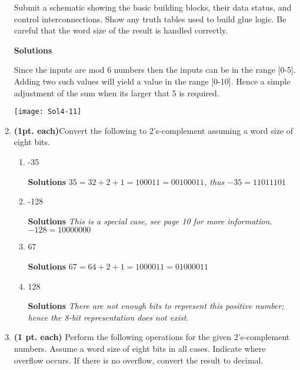 \begin{enumerate}
Submit a schematic showing the basic building blocks, their
data status, and control interconnections.  Show any truth
tables used to build glue logic.  Be careful that the word
size of the result is handled correctly.

\begin{onlysolution} \textbf{Solutions} \itshape{
Since the inputs are mod 6 numbers then the inputs can be in the
range [0-5].  Adding two such values will yield a value in the 
range [0-10].  Hence a simple adjustment of the sum when its larger
that 5 is required.

\texttt{[image: Sol4-11]}

} \end{onlysolution} 

\item \textbf{ (1pt. each)}Convert the following to 2's-complement 
assuming a word size of eight bits. 
\begin{enumerate}
\item -35 

\begin{onlysolution} \textbf{Solutions} \itshape{
$35 = 32+2+1 = 100011 = 00100011$, thus $-35=11011101$
} \end{onlysolution} 

\item  -128 

\begin{onlysolution} \textbf{Solutions} \itshape{
This is a special case, see page 10 for more information.
$-128 = 10000000$
} \end{onlysolution} 

\item  67 

\begin{onlysolution} \textbf{Solutions} \itshape{
$67=64+2+1 = 100 0011 = 0100 0011$
} \end{onlysolution} 

\item  128 

\begin{onlysolution} \textbf{Solutions} \itshape{
There are not enough bits to represent this positive number; hence
the 8-bit representation does not exist.
} \end{onlysolution} 

\end{enumerate}


\item \textbf{ (1 pt. each)} Perform the following operations for the given 
2's-complement numbers. Assume a word size of eight bits
in all cases. Indicate where overflow occurs. If there is no overflow, 
convert the result to decimal. 
\begin{enumerate}


\end{enumerate}
\end{enumerate}
